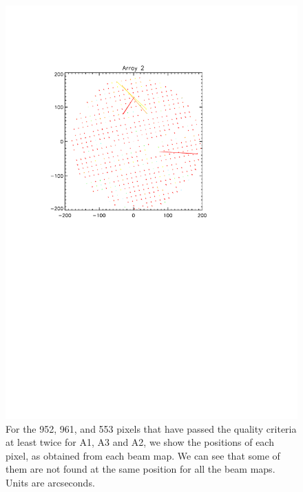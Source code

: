 \begin{figure}[htp]
\begin{center}
\includegraphics[trim=2cm 14cm 5cm 4cm, clip=true,width=0.6\linewidth]{Figures/A2_positions.pdf}
\caption{For the 952, 961, and 553 pixels that have passed the quality criteria at least twice for A1, A3 and A2, we show the positions of each pixel, as obtained from each beam map. We can see that some of them are not found at the same position for all the beam maps. Units are arcseconds.}
\label{fig:jumping_kids}
\end{center}
\end{figure}

